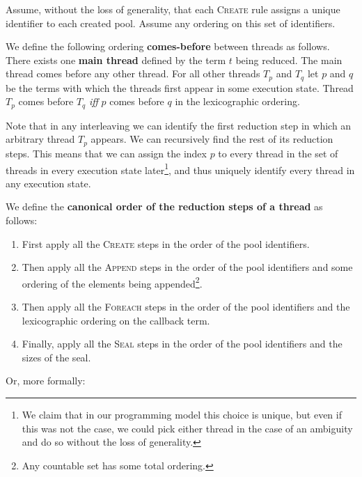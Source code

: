 \documentclass[runningheads,a4paper]{llncs}
\begin{document}
\begin{definition}
Assume, without the loss of generality, that each \textsc{Create}
rule assigns a unique identifier to each created pool.
Assume any ordering on this set of identifiers.

We define the following ordering \textbf{comes-before} between threads as follows.
There exists one \textbf{main thread} defined by the term $t$ being
reduced.
The main thread comes before any other thread.
For all other threads $T_p$ and $T_q$ let $p$ and $q$ be the terms
with which the threads first appear in some execution state.
Thread $T_p$ comes before $T_q$ \emph{iff} $p$ comes before $q$ in the
lexicographic ordering.

Note that in any interleaving we can identify the first reduction step
in which an arbitrary thread $T_p$ appears.
We can recursively find the rest of its reduction steps.
This means that we can assign the index $p$ to every thread in the set
of threads in every execution state later\footnote{We claim that in
our programming model this choice is unique, but even if this was
not the case, we could pick either thread in the case of an ambiguity
and do so without the loss of generality.}, and thus uniquely identify
every thread in any execution state.

We define the \textbf{canonical order of the reduction steps of a
thread} as follows:
\begin{enumerate}
\item First apply all the \textsc{Create} steps in the order of the pool
identifiers.
\item Then apply all the \textsc{Append} steps in the order of the pool
identifiers and some ordering of the elements being
appended\footnote{Any countable set has some total ordering.}.
\item Then apply all the \textsc{Foreach} steps in the order of the pool
identifiers and the lexicographic ordering on the callback term.
\item Finally, apply all the \textsc{Seal} steps in the order of the
pool identifiers and the sizes of the seal.
\end{enumerate}

Or, more formally:


\end{definition}
\end{document}
